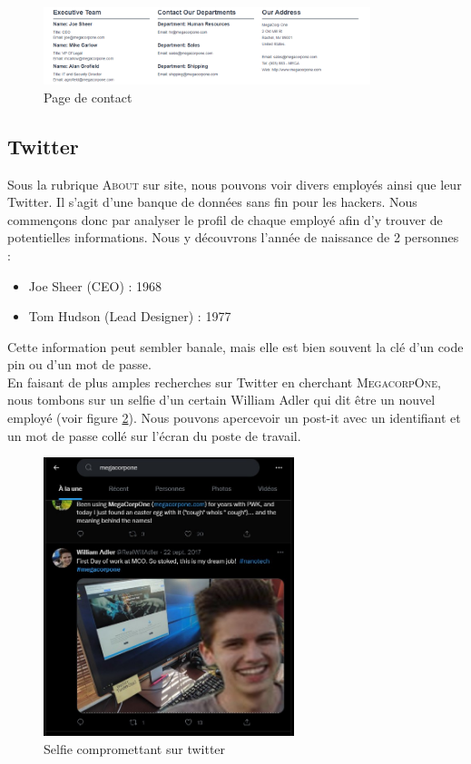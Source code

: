 \documentclass[a4paper]{article}
\begin{document}
\begin{figure}[H]
    \centering
    \includegraphics[width=0.85\textwidth]{images/lab1/Contact.PNG}
    \caption{Page de contact}
    \label{fig:contact}
\end{figure}

\subsection{Twitter}\label{sec:twitter}
Sous la rubrique \textsc{About} sur site, nous pouvons voir divers employés ainsi que leur Twitter.
Il s'agit d'une banque de données sans fin pour les hackers. Nous commençons donc par analyser le profil de chaque employé afin d'y trouver de potentielles informations. Nous y découvrons l'année de naissance de 2 personnes :
\begin{itemize}
    \item Joe Sheer (CEO) : 1968
    \item Tom Hudson (Lead Designer) : 1977
\end{itemize}
Cette information peut sembler banale, mais elle est bien souvent la clé d'un code pin ou d'un mot de passe.\\[0.2cm]

En faisant de plus amples recherches sur Twitter en cherchant \textsc{MegacorpOne}, nous tombons sur un selfie d'un certain William Adler qui dit être un nouvel employé (voir figure \ref{fig:selfie}). Nous pouvons apercevoir un post-it avec un identifiant et un mot de passe collé sur l'écran du poste de travail.
\begin{figure}[H]
    \centering
    \includegraphics[width=0.65\textwidth]{images/lab1/twitter.jpg}
    \caption{Selfie compromettant sur twitter}
    \label{fig:selfie}
\end{figure}
\end{document}
